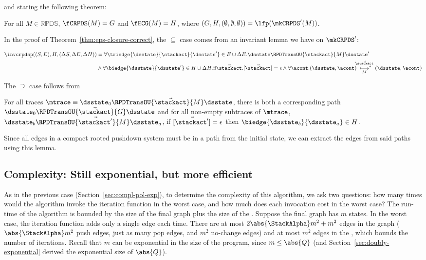 and stating the following theorem:

\begin{theorem}\label{thm:eps-closure-correct}
  For all $M \in \mathbb{RPDS}$, $\fCRPDS(M) = G$ and $\fECG(M) = H$,
  where $(G,H,(\emptyset,\emptyset,\emptyset)) = \lfp(\mkCRPDS'(M))$.
\end{theorem}
In the proof of Theorem~\ref{thm:eps-closure-correct}, the $\subseteq$
case comes from an invariant lemma we have on $\mkCRPDS'$:

\begin{lemma}
\begin{align*}
  \invcrpdsp((S, E), H, (\Delta S, \Delta E, \Delta H)) &=
    \forall \triedge{\dsstate}{\stackact}{\dsstate'} \in E \cup \Delta E. \dsstate \RPDTransOU{\stackact}{M} \dsstate' \\
   &\wedge \forall \biedge{\dsstate}{\dsstate'} \in H \cup \Delta H.
             \exists \vec{\stackact}. [\vec{\stackact}] = \epsilon
                     \wedge \forall \acont. (\dsstate, \acont) \overset{\mkern-12mu\vec{\stackact}}{\underset{\mkern-12mu{}M}{\longmapsto^*}} (\dsstate, \acont)
\end{align*}  
\end{lemma}
The $\supseteq$ case follows from
\begin{lemma}
  For all traces $\mtrace \equiv \dsstate_0 \RPDTransOU{\vec{\stackact}}{M} \dsstate$,
  there is both a corresponding path $\dsstate_0 \RPDTransOU{\vec{\stackact}}{G} \dsstate$ and
  for all non-empty subtraces of $\mtrace$, $\dsstate_b \RPDTransOU{\vec{\stackact'}}{M} \dsstate_a$, if $[\vec{\stackact'}] = \epsilon$ then $\biedge{\dsstate_b}{\dsstate_a} \in H$.
\end{lemma}

Since all edges in a compact rooted pushdown system must be in a path from the initial state, we can extract the edges from said paths using this lemma.

\subsection{Complexity: Still exponential, but more efficient}

As in the previous case (Section~\ref{sec:compl-pol-exp}), to
determine the complexity of this algorithm, we ask two questions: how
many times would the algorithm invoke the iteration function in the
worst case, and how much does each invocation cost in the worst case?
The run-time of the algorithm is bounded by the size of the final
graph plus the size of the \ecg.
Suppose the final graph has $m$ states.
In the worst case, the iteration function adds only a single edge each
time.
There are at most $2\abs{\StackAlpha}m^2 + m^2$ edges in the graph ($\abs{\StackAlpha}m^2$ push edges, just as many pop edges, and $m^2$ no-change edges) and
at most $m^2$ edges in the \ecg{}, which bounds the number of
iterations.
Recall that $m$ can be exponential in the size of the program, since $m \leq \abs{Q}$ (and Section~\ref{sec:doubly-exponential} derived the exponential size of $\abs{Q}$).

